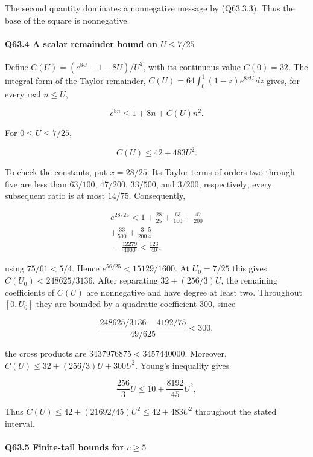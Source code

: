 The second quantity dominates a nonnegative message by (Q63.3.3). Thus the base of the square is nonnegative.


\paragraph{Q63.4 A scalar remainder bound on $U\le\allowbreak 7/25$}

Define $C(U)=\allowbreak (e^{8U}-1-8U)/U^2$, with its continuous value $C(0)=\allowbreak 32$.
The integral form of the Taylor remainder,
\(C(U)=\allowbreak 64\int_0^1(1-z)e^{8zU}\,\allowbreak  dz\)
gives, for every real $n\le\allowbreak  U$,

\[
e^{8n}\le1+8n+C(U)n^2.
\tag{Q63.4.1}\label{eq:Q63:Q63:4:1}
\]

For $0\le\allowbreak  U\le\allowbreak 7/25$,

\[
\boxed{C(U)\le42+483U^2.}
\tag{Q63.4.2}\label{eq:Q63:Q63:4:2}
\]

To check the constants, put $x=\allowbreak 28/25$. Its Taylor terms of orders two through five are less than
$63/100$, $47/200$, $33/500$, and $3/200$, respectively; every subsequent ratio is at most $14/75$.
Consequently,

\[
\begin{gathered}
e^{28/25}<1+\frac{28}{25}+\frac{63}{100}+\frac{47}{200}\\
+\frac{33}{500}+\frac3{200}\frac54\\
=\frac{12279}{4000}<\frac{123}{40}.
\end{gathered}
\]

using $75/61<\allowbreak 5/4$. Hence $e^{56/25}<\allowbreak 15129/1600$.
At $U_0=\allowbreak 7/25$ this gives $C(U_0)<\allowbreak 248625/3136$.
After separating $32+(256/3)U$, the remaining coefficients of $C(U)$ are nonnegative and have degree at least two.
Throughout $[0,\allowbreak  U_0]$ they are bounded by a quadratic coefficient 300, since

\[
\frac{248625/3136-4192/75}{49/625}<300,
\]

the cross products are $3437976875<\allowbreak 3457440000$. Moreover,
\(C(U)\le\allowbreak 32+(256/3)U+300U^2\).
Young's inequality gives

\[
\frac{256}{3}U\le10+\frac{8192}{45}U^2,
\]

Thus $C(U)\le\allowbreak 42+(21692/45)U^2\le\allowbreak 42+483U^2$ throughout the stated interval.

\paragraph{Q63.5 Finite-tail bounds for $c\ge\allowbreak 5$}

